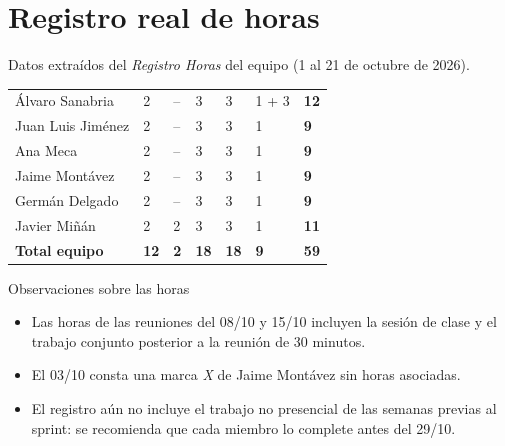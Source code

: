 \documentclass[11pt,a4paper]{article}
\begin{document}
\section{Registro real de horas}\label{sec:horas}
Datos extraídos del \textit{Registro Horas} del equipo (1 al 21 de octubre de 2026).

\begin{longtable}{|P{3.3cm}|C{1.6cm}|C{1.6cm}|C{1.6cm}|C{1.6cm}|C{1.6cm}|C{1.7cm}|}
\hline
{} &  &  &  &  &  &  \\ \hline
\endhead
Álvaro Sanabria & 2 & -- & 3 & 3 & 1 + 3 & \textbf{12} \\ \hline
Juan Luis Jiménez & 2 & -- & 3 & 3 & 1 & \textbf{9} \\ \hline
Ana Meca & 2 & -- & 3 & 3 & 1 & \textbf{9} \\ \hline
Jaime Montávez & 2 & -- & 3 & 3 & 1 & \textbf{9} \\ \hline
Germán Delgado & 2 & -- & 3 & 3 & 1 & \textbf{9} \\ \hline
Javier Miñán & 2 & 2 & 3 & 3 & 1 & \textbf{11} \\ \hline
{}\textbf{Total equipo} & \textbf{12} & \textbf{2} & \textbf{18} & \textbf{18} & \textbf{9} & \textbf{59} \\ \hline
\end{longtable}

\begin{verde}{Observaciones sobre las horas}
\begin{itemize}
\item Las horas de las reuniones del 08/10 y 15/10 incluyen la sesión de clase y el trabajo conjunto posterior a la reunión de 30 minutos.
\item El 03/10 consta una marca \textit{X} de Jaime Montávez sin horas asociadas.
\item El registro aún no incluye el trabajo no presencial de las semanas previas al sprint: se recomienda que cada miembro lo complete antes del 29/10.
\end{itemize}
\end{verde}
\end{document}
